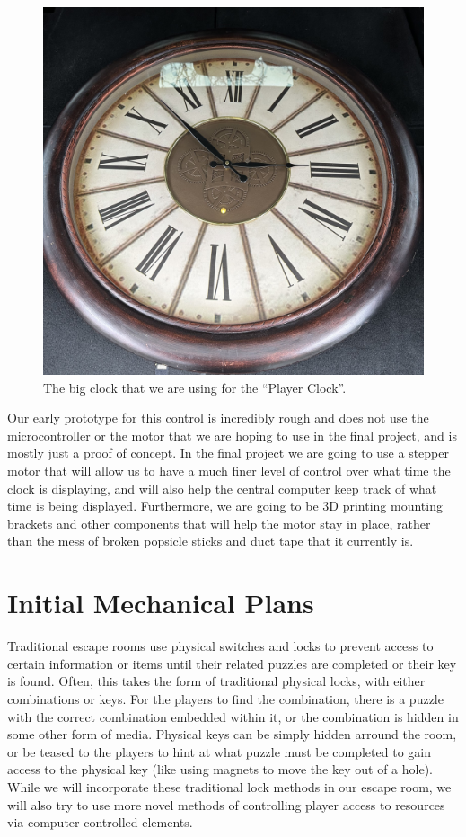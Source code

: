 \documentclass[conference]{IEEEtran}
\begin{document}
\begin{figure}[ht]
    \centering
    \includegraphics[width=0.85\columnwidth]{Images/big-clock.jpg}
    \caption{The big clock that we are using for the ``Player Clock''.}
\end{figure}

Our early prototype for this control is incredibly rough and does not use the microcontroller or the
motor that we are hoping to use in the final project, and is mostly just a proof of concept. In the
final project we are going to use a stepper motor that will allow us to have a much finer level of
control over what time the clock is displaying, and will also help the central computer keep track of
what time is being displayed. Furthermore, we are going to be 3D printing mounting brackets and other
components that will help the motor stay in place, rather than the mess of broken popsicle sticks and
duct tape that it currently is.

\section{Initial Mechanical Plans}
Traditional escape rooms use physical switches and locks to prevent access to certain information or
items until their related puzzles are completed or their key is found. Often, this takes the form of
traditional physical locks, with either combinations or keys. For the players to find the combination,
there is a puzzle with the correct combination embedded within it, or the combination is hidden in some
other form of media. Physical keys can be simply hidden arround the room, or be teased to the players
to hint at what puzzle must be completed to gain access to the physical key (like using magnets to move
the key out of a hole). While we will incorporate these traditional lock methods in our escape room,
we will also try to use more novel methods of controlling player access to resources via computer controlled
elements.
\end{document}

